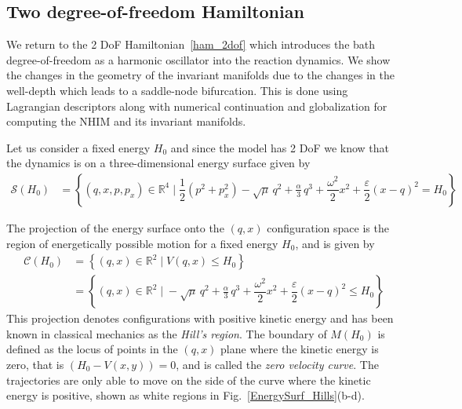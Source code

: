 \documentclass{ws-ijbc}
\begin{document}
\subsection{Two degree-of-freedom Hamiltonian}
\label{sec:RD_2DOF}

We return to the 2 DoF Hamiltonian~\eqref{ham_2dof} which introduces the bath degree-of-freedom as a harmonic oscillator into the reaction dynamics. We show the changes in the geometry of the invariant manifolds due to the changes in the well-depth which leads to a saddle-node bifurcation. This is done using Lagrangian descriptors along with numerical continuation and globalization for computing the NHIM and its invariant manifolds.

Let us consider a fixed energy $H_0$ and since the model has 2 DoF we know that the dynamics is on a three-dimensional energy surface given by
\begin{equation}
\begin{split}
\mathcal{S}(H_0) &= \left\lbrace (q,x,p,p_x) \in \mathbb{R}^4 \; \big|\; \dfrac{1}{2} \left(p^2 + p_x^2 \right) - \sqrt{\mu} \, q^2 + \frac{\alpha}{3} \,q^3 + \dfrac{\omega^2}{2} x^2 + \dfrac{\varepsilon}{2} \left(x-q\right)^2 = H_0 \right\rbrace
\end{split}
\end{equation}

The projection of the energy surface onto the $(q,x)$ configuration space 
is the region of energetically possible motion for a fixed energy $H_0$, and is given  by
\begin{equation}
\begin{split}
\mathcal{C}(H_0) &= \left\lbrace (q,x) \in \mathbb{R}^2 \; \big|\; V(q,x) \leqslant H_0 \right\rbrace \\ 
&= \left\lbrace (q,x) \in \mathbb{R}^2 \; \big|\; - \sqrt{\mu} \, q^2 + \frac{\alpha}{3} \,q^3 + \dfrac{\omega^2}{2} x^2 + \dfrac{\varepsilon}{2} \left(x-q\right)^2 \leqslant H_0 \right\rbrace
\end{split}
\label{eqn:hillsreg}
\end{equation}
This projection denotes configurations with positive kinetic energy and has been known in classical mechanics as the \textit{Hill's region}. The boundary of $M(H_0)$ is defined as the locus of points in the $(q,x)$ plane where the kinetic energy is zero, that is $(H_0 - V(x,y)) = 0 $, and is called the \textit{zero velocity curve}. The trajectories are only able to move on the side of the curve where the kinetic energy is positive, shown as white regions in Fig.~\ref{EnergySurf_Hills}(b-d). 
\end{document}
